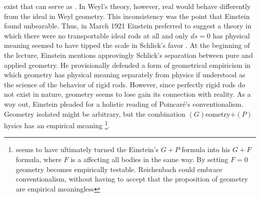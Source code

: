 \documentclass[draft]{article}
\newcommand{\WT}{Weyl's theory\xspace}
\begin{document}
{exist that can serve as \rac. In \WT, however, real \rac would behave differently from the ideal \rac in Weyl geometry. This inconsistency was the point that Einstein found unbearable. Thus, in March 1921 Einstein preferred to suggest a theory in which there were no transportable ideal rods at all and only $ds=0$ has physical meaning \citep{Einstein1921c}} seemed to have tipped the scale in Schlick's favor \citep[5]{Reichenbach1921a}. At the beginning of the lecture, Einstein mentions approvingly Schlick's separation between pure and applied geometry.  He provisionally defended a form of geometrical empiricism in which geometry has physical meaning separately from physics if understood as the science of the behavior of rigid rods. However, since perfectly rigid rods do not exist in nature, geometry seems to lose gain its connection with reality. As a way out, Einstein pleaded for a holistic reading of Poincaré's conventionalism. Geometry isolated might be arbitrary, but the combination $(G)$eometry+$(P)$hysics has an empirical meaning \citep[5]{Reichenbach1921a}\footnote{\citet{Reichenbach1922a} seems to have ultimately turned the Einstein's $G+P$ formula into his $G + F$ formula, where $F$ is a  affecting all bodies in the same way. By setting $F=0$ geometry becomes empirically testable. Reichenbach could embrace conventionalism, without having to accept that the proposition of geometry are empirical meaningless}.










\end{document}
